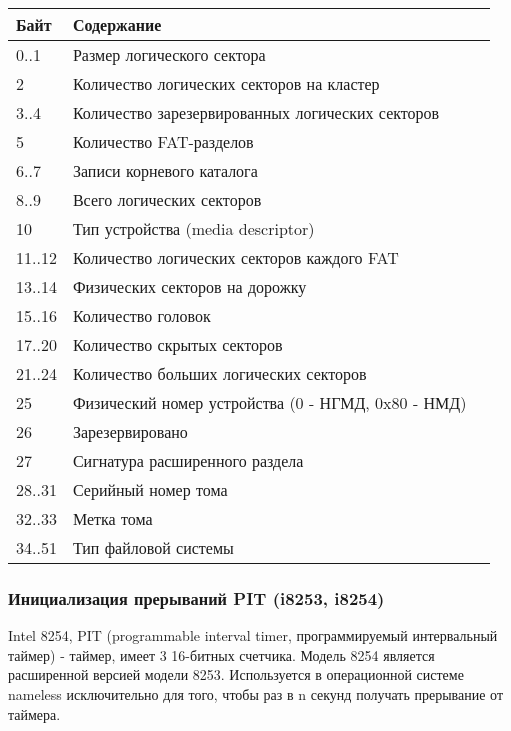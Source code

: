 \documentclass[12pt]{article}
\begin{document}
	\begin{tabular}{|l|l|l|}
		\hline
		Байт     & Содержание                                         \\ \hline
		0..1     & Размер логического сектора                         \\ \hline
		2        & Количество логических секторов на кластер          \\ \hline
		3..4     & Количество зарезервированных логических секторов   \\ \hline
		5        & Количество FAT-разделов                            \\ \hline
		6..7     & Записи корневого каталога                          \\ \hline
		8..9     & Всего логических секторов                          \\ \hline
		10       & Тип устройства (media descriptor)                  \\ \hline
		11..12   & Количество логических секторов каждого FAT         \\ \hline
		13..14   & Физических секторов на дорожку                     \\ \hline
		15..16   & Количество головок                                 \\ \hline
		17..20   & Количество скрытых секторов                        \\ \hline
		21..24   & Количество больших логических секторов             \\ \hline
		25       & Физический номер устройства (0 - НГМД, 0x80 - НМД) \\ \hline
		26       & Зарезервировано                                    \\ \hline
		27       & Сигнатура расширенного раздела                     \\ \hline
		28..31   & Серийный номер тома                                \\ \hline
		32..33   & Метка тома                                         \\ \hline
		34..51   & Тип файловой системы                               \\
		\hline
	\end{tabular}

\subsubsection{Инициализация прерываний PIT (i8253, i8254)}
	Intel 8254, PIT (programmable interval timer, программируемый интервальный таймер) - таймер, имеет 3 16-битных счетчика. Модель 8254 является расширенной версией модели 8253. Используется в операционной системе nameless исключительно для того, чтобы раз в n секунд получать прерывание от таймера.
\end{document}
